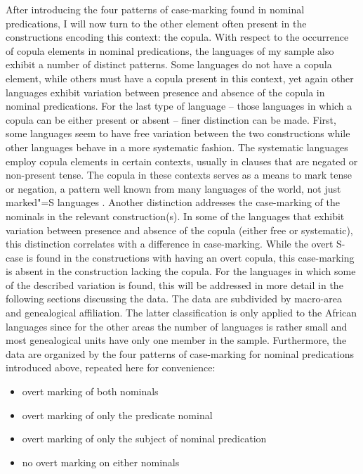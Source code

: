 After introducing the four patterns of case-marking found in nominal predications, I will now turn to the other element often present in the constructions encoding this context: the copula. 
With respect to the occurrence of copula elements in nominal predications, the languages of my sample also exhibit a number of distinct patterns. 
Some languages do not have a copula element, while others must have a copula present in this context, yet again other languages exhibit variation between presence and absence of the copula in nominal predications. 
For the last type of language -- those languages in which a copula can be either present or absent -- finer distinction can be made.
First, some languages seem to have free variation between the two constructions while other languages behave in a more systematic fashion. 
The systematic languages employ copula elements in certain contexts, usually in clauses that are negated or non-present tense. 
The copula in these contexts serves as a means to mark tense or negation, a pattern well known from many languages of the world, not just marked"=S languages \citep[119]{Payne:1997}. Another distinction addresses the case-marking of the nominals in the relevant construction(s).
In some of the languages that exhibit variation between presence and absence of the copula (either free or systematic), this distinction correlates with a difference in case-marking. While the overt S-case is found in the constructions with having an overt copula, this case-marking is absent in the construction lacking the copula. 
For the languages in which some of the described variation is found, this will be addressed in more detail in the following sections discussing the data.  
The data are subdivided by macro-area and genealogical affiliation. 
The latter classification is only applied to the African languages since for the other areas the number of languages is rather small and most genealogical units have only one member in the sample. 
Furthermore, the data are organized by the four patterns of case-marking for nominal predications introduced above, repeated here for convenience: 

\begin{itemize}
\item overt marking of both nominals 
\item overt marking of only the predicate nominal
\item overt marking of only the subject of nominal predication
\item no overt marking on either nominals  
\end{itemize}


